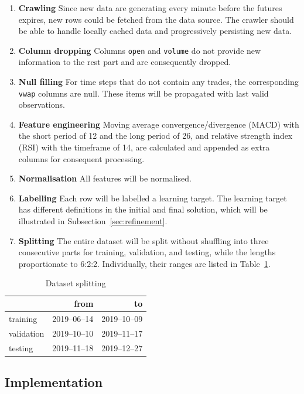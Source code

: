 \documentclass[12pt, letterpaper]{article}
\begin{document}
\begin{enumerate}
    \item \textbf{Crawling} Since new data are generating every minute before the futures expires, new rows could be fetched from the data source. The crawler should be able to handle locally cached data and progressively persisting new data.
    \item \textbf{Column dropping} Columns \texttt{open} and \texttt{volume} do not provide new information to the rest part and are consequently dropped.
    \item \textbf{Null filling} For time steps that do not contain any trades, the corresponding \texttt{vwap} columns are null. These items will be propagated with last valid observations.
    \item \textbf{Feature engineering} Moving average convergence/divergence (MACD) with the short period of 12 and the long period of 26, and relative strength index (RSI) with the timeframe of 14, are calculated and appended as extra columns for consequent processing.
    \item \textbf{Normalisation} All features will be normalised.
    \item \textbf{Labelling} Each row will be labelled a learning target. The learning target has different definitions in the initial and final solution, which will be illustrated in Subsection~\ref{sec:refinement}.
    \item \textbf{Splitting} The entire dataset will be split without shuffling into three consecutive parts for training, validation, and testing, while the lengths proportionate to 6:2:2. Individually, their ranges are listed in Table~\ref{table:split}.
\end{enumerate}

\begin{table}
    \centering
    \begin{tabular}{lrr}
        \toprule
                   &         from &           to \\
        \midrule
        training   & 2019--06--14 & 2019--10--09 \\
        validation & 2019--10--10 & 2019--11--17 \\
        testing    & 2019--11--18 & 2019--12--27 \\
        \bottomrule
    \end{tabular}
    \caption{Dataset splitting}%
    \label{table:split}
\end{table}

\subsection{Implementation}
\end{document}
